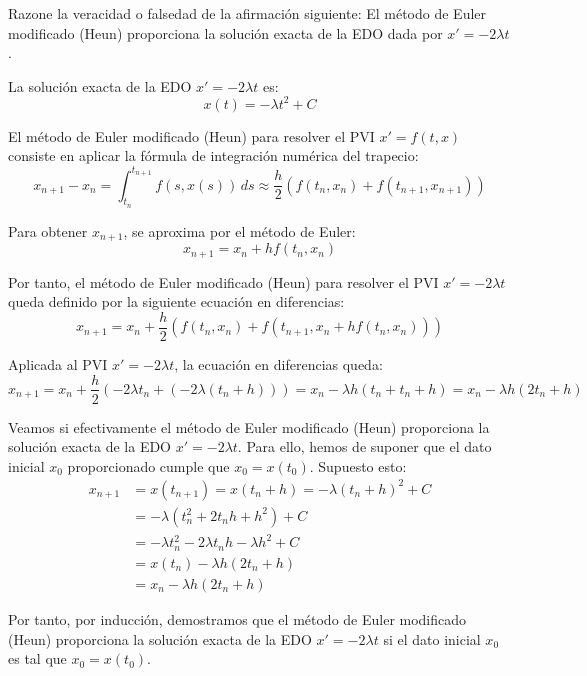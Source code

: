\begin{ejercicio}\label{ej:3.1.4}
    Razone la veracidad o falsedad de la afirmación siguiente: El método de Euler modificado (Heun) proporciona la solución exacta de la EDO dada por $x' = -2\lambda t$.

    La solución exacta de la EDO $x' = -2\lambda t$ es:
    \begin{equation*}
        x(t) = -\lambda t^2 + C
    \end{equation*}

    El método de Euler modificado (Heun) para resolver el PVI $x' = f(t, x)$ consiste en aplicar la fórmula de integración numérica del trapecio:
    \begin{equation*}
        x_{n+1} - x_n = \int_{t_n}^{t_{n+1}} f(s, x(s))\, ds \approx \frac{h}{2} \left( f(t_n, x_n) + f(t_{n+1}, x_{n+1}) \right)
    \end{equation*}

    Para obtener $x_{n+1}$, se aproxima por el método de Euler:
    \begin{equation*}
        x_{n+1} = x_n + h f(t_n, x_n)
    \end{equation*}

    Por tanto, el método de Euler modificado (Heun) para resolver el PVI $x' = -2\lambda t$ queda definido por la siguiente ecuación en diferencias:
    \begin{equation*}
        x_{n+1} = x_n + \frac{h}{2} \left( f(t_n, x_n) + f(t_{n+1}, x_n + h f(t_n, x_n)) \right)
    \end{equation*}

    Aplicada al PVI $x' = -2\lambda t$, la ecuación en diferencias queda:
    \begin{equation*}
        x_{n+1} = x_n + \frac{h}{2} \left( -2\lambda t_n + (-2\lambda (t_n + h)) \right)
        = x_n - \lambda h (t_n + t_ n + h)
        = x_n - \lambda h (2t_n + h)
    \end{equation*}

    Veamos si efectivamente el método de Euler modificado (Heun) proporciona la solución exacta de la EDO $x' = -2\lambda t$. Para ello, hemos de suponer que el dato inicial $x_0$ proporcionado cumple que $x_0 = x(t_0)$. Supuesto esto:
    \begin{align*}
        x_{n+1} &= x(t_{n+1}) = x(t_n + h) = -\lambda (t_n + h)^2 + C \\
        &= -\lambda (t_n^2 + 2t_n h + h^2) + C \\
        &= -\lambda t_n^2 - 2\lambda t_n h - \lambda h^2 + C \\
        &= x(t_n) - \lambda h (2t_n + h) \\
        &= x_n - \lambda h (2t_n + h)
    \end{align*}

    Por tanto, por inducción, demostramos que el método de Euler modificado (Heun) proporciona la solución exacta de la EDO $x' = -2\lambda t$ si el dato inicial $x_0$ es tal que $x_0 = x(t_0)$.
\end{ejercicio}

